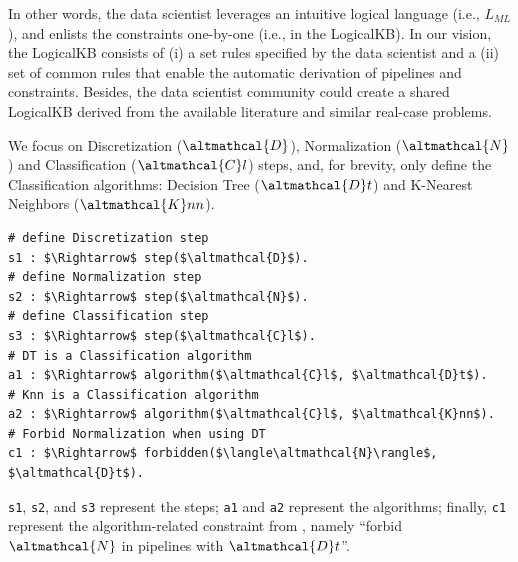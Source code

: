 In other words, the data scientist leverages an intuitive logical language (i.e., $L_{ML}$), and enlists the constraints one-by-one (i.e., in the LogicalKB).
In our vision, the LogicalKB consists of (i) a set rules specified by the data scientist and a (ii) set of common rules that enable the automatic derivation of pipelines and constraints.
Besides, the data scientist community could create a shared LogicalKB derived from the available literature and similar real-case problems.

\begin{example}\label{ex:kb}
We focus on Discretization ($\altmathcal{D}$),  Normalization ($\altmathcal{N}$) and Classification ($\altmathcal{C}l$) steps, and, for brevity, only define the Classification algorithms: Decision Tree ($\altmathcal{D}t$) and K-Nearest Neighbors ($\altmathcal{K}nn$).
\begin{lstlisting}[mathescape=true]
# define Discretization step
s1 : $\Rightarrow$ step($\altmathcal{D}$).
# define Normalization step
s2 : $\Rightarrow$ step($\altmathcal{N}$).
# define Classification step
s3 : $\Rightarrow$ step($\altmathcal{C}l$).
# DT is a Classification algorithm
a1 : $\Rightarrow$ algorithm($\altmathcal{C}l$, $\altmathcal{D}t$).
# Knn is a Classification algorithm
a2 : $\Rightarrow$ algorithm($\altmathcal{C}l$, $\altmathcal{K}nn$).
# Forbid Normalization when using DT
c1 : $\Rightarrow$ forbidden($\langle\altmathcal{N}\rangle$, $\altmathcal{D}t$).
\end{lstlisting}
\noindent \texttt{s1}, \texttt{s2}, and \texttt{s3} represent the steps; \texttt{a1} and \texttt{a2} represent the algorithms; finally, \texttt{c1} represent the algorithm-related constraint from , namely ``forbid $\altmathcal{N}$ in pipelines with $\altmathcal{D}t$''.
\end{example}

